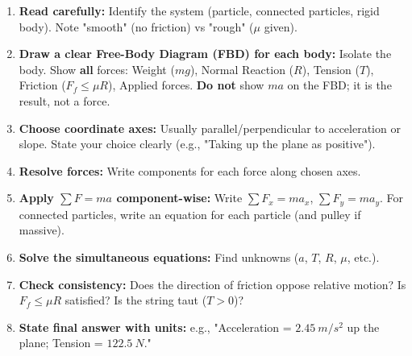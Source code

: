 \documentclass[11pt]{article}
\begin{document}
\begin{methode}
\begin{enumerate}
    \item \textbf{Read carefully:} Identify the system (particle, connected particles, rigid body). Note "smooth" (no friction) vs "rough" ($\mu$ given).
    \item \textbf{Draw a clear Free-Body Diagram (FBD) for \textbf{each} body:} Isolate the body. Show \textbf{all} forces: Weight ($mg$), Normal Reaction ($R$), Tension ($T$), Friction ($F_f \le \mu R$), Applied forces. \textbf{Do not} show $ma$ on the FBD; it is the result, not a force.
    \item \textbf{Choose coordinate axes:} Usually parallel/perpendicular to acceleration or slope. State your choice clearly (e.g., "Taking up the plane as positive").
    \item \textbf{Resolve forces:} Write components for each force along chosen axes.
    \item \textbf{Apply $\sum F = ma$ component-wise:} Write $\sum F_x = ma_x$, $\sum F_y = ma_y$. For connected particles, write an equation for each particle (and pulley if massive).
    \item \textbf{Solve the simultaneous equations:} Find unknowns ($a$, $T$, $R$, $\mu$, etc.).
    \item \textbf{Check consistency:} Does the direction of friction oppose relative motion? Is $F_f \le \mu R$ satisfied? Is the string taut ($T > 0$)?
    \item \textbf{State final answer with units:} e.g., "Acceleration = $\SI{2.45}{m/s^2}$ up the plane; Tension = $\SI{122.5}{N}$."
\end{enumerate}
\end{methode}
\end{document}
